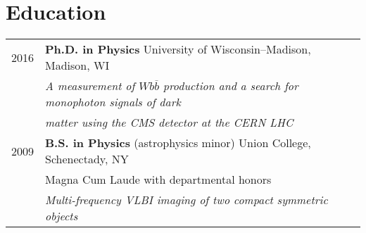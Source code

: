 \documentclass[letterpaper,12pt]{article} %
\begin{document}


\section{Education}
\begin{tabular}{rl}	
  2016 & {\bf Ph.D. in Physics} University of Wisconsin--Madison, Madison, WI \\
   {}  & \emph{A measurement of $Wb\overline{b}$ production and a search for monophoton signals of dark}\\
   {}  & \emph{matter using the CMS detector at the CERN LHC} \\

   2009 & {\bf B.S. in Physics} (astrophysics minor) Union College, Schenectady, NY \\
   {}  & Magna Cum Laude with departmental honors \\
   {}  & \emph{Multi-frequency VLBI imaging of two compact symmetric objects} \\
\end{tabular}

\vspace{9pt}

\end{document}
